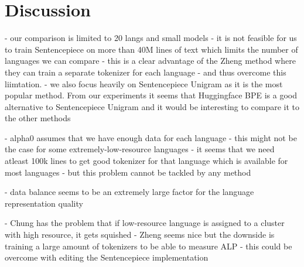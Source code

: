 
\chapter{Discussion}

- our comparison is limited to 20 langs and small models
    - it is not feasible for us to train Sentencepiece on more than 40M lines of text which limits the number of languages we can compare
    - this is a clear advantage of the Zheng method where they can train a separate tokenizer for each language - and thus overcome this liimtation.
- we also focus heavily on Sentencepiece Unigram as it is the most popular method. From our experiments it seems that Huggingface BPE is a good alternative to Sentencepiece Unigram and it would be interesting to compare it to the other methods

- alpha0 assumes that we have enough data for each language
    - this might not be the case for some extremely-low-resource languages
    - it seems that we need atleast 100k lines to get good tokenizer for that language which is available for most languages
    - but this problem cannot be tackled by any method

- data balance seems to be an extremely large factor for the language representation quality

- Chung has the problem that if low-resource language is assigned to a cluster with high resource, it gets squished
- Zheng seems nice but the downside is training a large amount of tokenizers to be able to measure ALP - this could be overcome with editing the Sentencepiece implementation